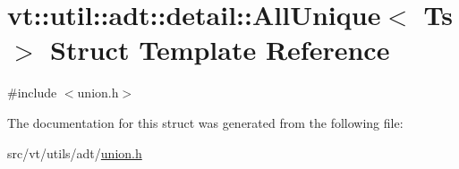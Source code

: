 \hypertarget{structvt_1_1util_1_1adt_1_1detail_1_1_all_unique}{}\section{vt\+:\+:util\+:\+:adt\+:\+:detail\+:\+:All\+Unique$<$ Ts $>$ Struct Template Reference}
\label{structvt_1_1util_1_1adt_1_1detail_1_1_all_unique}


{\ttfamily \#include $<$union.\+h$>$}



The documentation for this struct was generated from the following file\+:\begin{DoxyCompactItemize}
\item 
src/vt/utils/adt/\hyperlink{union_8h}{union.\+h}\end{DoxyCompactItemize}
